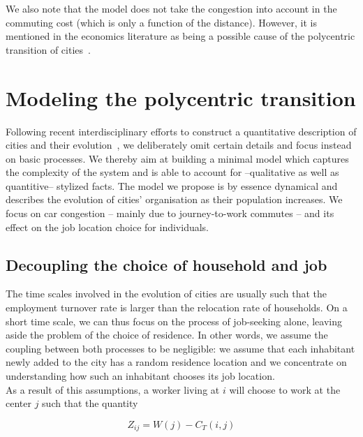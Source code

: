 We also note that the model does not take the congestion into account in the
commuting cost (which is only a function of the distance). However, it is
mentioned in the economics literature as being a possible cause of the
polycentric transition of cities~\cite{McMillen:2003}. 

\section{Modeling the polycentric transition}
\label{sec:an_out_of_equilibrium_model_}

Following recent interdisciplinary efforts to construct a quantitative
description of cities and their
evolution~\cite{Makse:1995,Zanette:1997,Marsili:1998a,Marsili:1998b,Batty:book2005,Bettencourt:2007,Batty:2008},
we deliberately omit certain details and focus instead on basic processes. We
thereby aim at building a minimal model which captures the complexity of the
system and is able to account for --qualitative as well as quantitive-- stylized
facts. 
The model we propose is by essence dynamical and describes the evolution
of cities' organisation as their population increases. We focus on car
congestion -- mainly due to journey-to-work commutes -- and its effect on the job
location choice for individuals.\\

\subsection{Decoupling the choice of household and job}
\label{sub:decoupling_the_choice_of_household_and_job}

The time scales involved in the evolution of cities are usually such that the
employment turnover rate is larger than the relocation rate of households. On a
short time scale, we can thus focus on the process of job-seeking alone, leaving
aside the problem of the choice of residence. In other words, we assume the
coupling between both processes to be negligible: we assume that each inhabitant
newly added to the city has a random residence location and we concentrate on
understanding how such an inhabitant chooses its job location.\\

As a result of this assumptions, a worker living at $i$
will choose to work at the center $j$ such that the quantity
 
\begin{equation}
    Z_{ij} = W(j) - C_T(i,j)
    \label{eq:Z_workers_general}
\end{equation}

